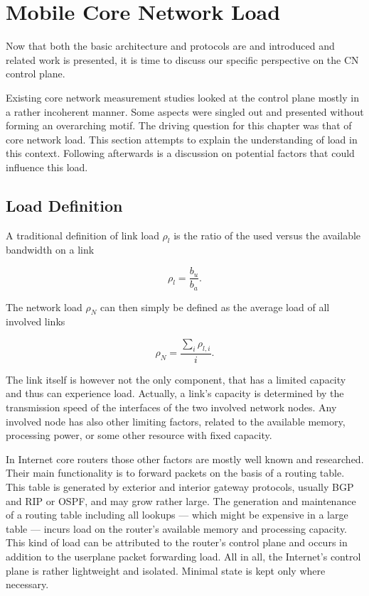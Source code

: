 \section{Mobile Core Network Load}
\label{c4:sec:loaddefinition}

Now that both the basic architecture and protocols are and introduced and related work is presented, it is time to discuss our specific perspective on the \gls{CN} control plane.

Existing core network measurement studies looked at the control plane mostly in a rather incoherent manner. Some aspects were singled out and presented without forming an overarching motif. The driving question for this chapter was that of core network load. This section attempts to explain the understanding of load in this context. Following afterwards is a discussion on potential factors that could influence this load.


\subsection{Load Definition}

A traditional definition of link load $\rho_{l}$ is the ratio of the used versus the available bandwidth on a link

\begin{equation}
\rho_{l} = \frac{b_{u}}{b_{a}}\text{.}
\end{equation}

The network load $\rho_{N}$ can then simply be defined as the average load of all involved links

\begin{equation}
\rho_{N} = \frac{\sum_{i} \rho_{l,i}}{i}\text{.}
\end{equation}

The link itself is however not the only component, that has a limited capacity and thus can experience load. Actually, a link's capacity is determined by the transmission speed of the interfaces of the two involved network nodes. Any involved node has also other limiting factors, related to the available memory, processing power, or some other resource with fixed capacity.

In Internet core routers those other factors are mostly well known and researched. Their main functionality is to forward packets on the basis of a routing table. This table is generated by exterior and interior gateway protocols, usually \gls{BGP} and \gls{RIP} or \gls{OSPF}, and may grow rather large. The generation and maintenance of a routing table including all lookups --- which might be expensive in a large table --- incurs load on the router's available memory and processing capacity. This kind of load can be attributed to the router's control plane and occurs in addition to the userplane packet forwarding load. All in all, the Internet's control plane is rather lightweight and isolated. Minimal state is kept only where necessary.

